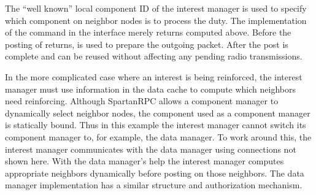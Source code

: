 The ``well known'' local component ID of the interest manager is used to
specify which component on neighbor nodes is to process the duty. The
implementation of the  command in the
 interface merely returns 
computed above. Before the posting of  returns,
 is used to prepare the outgoing packet. After the
post is complete  and  can be
reused without affecting any pending radio transmissions.


In the more complicated case where an interest is being reinforced, the
interest manager must use information in the data cache to compute which
neighbors need reinforcing. Although SpartanRPC allows a component
manager to dynamically select neighbor nodes, the component used as a
component manager is statically bound. Thus in this example the interest
manager cannot switch its component manager to, for example, the data
manager. To work around this, the interest manager communicates with the
data manager using connections not shown here. With the data manager's
help the interest manager computes appropriate neighbors dynamically
before posting  on those neighbors. The data manager
implementation has a similar structure and authorization mechanism.

